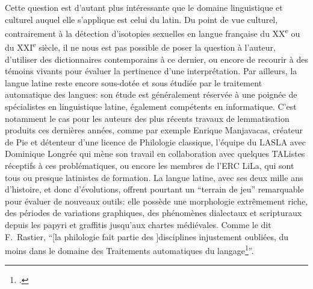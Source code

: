 Cette question est d'autant plus intéressante que le domaine linguistique et culturel auquel elle s'applique est celui du latin. Du point de vue culturel, contrairement à la détection d'isotopies sexuelles en langue française du XX\textsuperscript{e} ou du XXI\textsuperscript{e} siècle, il ne nous est pas possible de poser la question à l'auteur, d'utiliser des dictionnaires contemporains à ce dernier, ou encore de recourir à des témoins vivants pour évaluer la pertinence d'une interprétation. Par ailleurs, la langue latine reste encore sous-dotée et sous étudiée par le traitement automatique des langues: son étude est généralement réservée à une poignée de spécialistes en linguistique latine, également compétents en informatique. C'est notamment le cas pour les auteurs des plus récents travaux de lemmatisation produits ces dernières années, comme par exemple Enrique Manjavacas, créateur de Pie et détenteur d'une licence de Philologie classique, l'équipe du LASLA avec Dominique Longrée qui mène son travail en collaboration avec quelques TAListes réceptifs à ces problématiques, ou encore les membres de l'ERC LiLa, qui sont tous ou presque latinistes de formation. La langue latine, avec ses deux mille ans d'histoire, et donc d'évolutions, offrent pourtant un \enquote{terrain de jeu} remarquable pour évaluer de nouveaux outils: elle possède une morphologie extrêmement riche, des périodes de variations graphiques, des phénomènes dialectaux et scripturaux depuis les papyri et graffitis jusqu'aux chartes médiévales. Comme le dit F.~Rastier, \enquote{[la philologie fait partie des ]disciplines injustement oubliées, du moins dans le domaine des Traitements automatiques du langage\footcite{rastier2005enjeux}}. 


